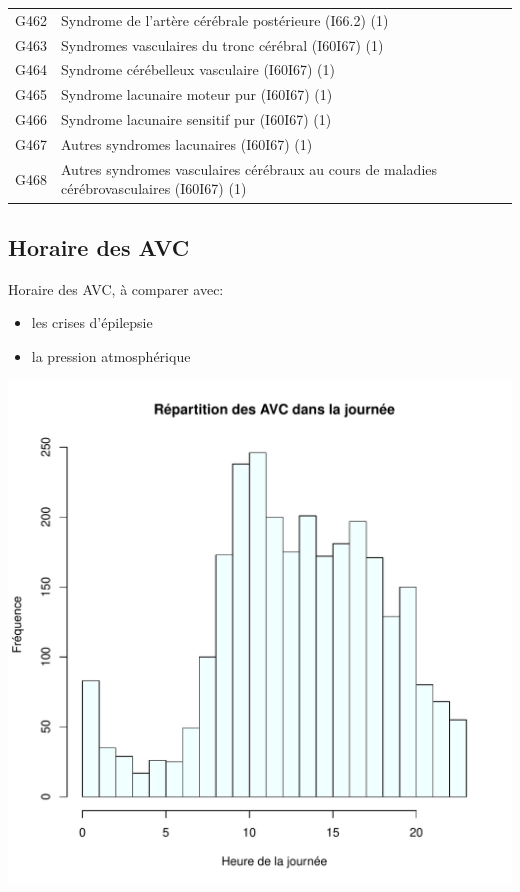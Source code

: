 \documentclass[12pt,english,french,twoside]{book}\usepackage[]{graphicx}\usepackage[]{color}
\makeatletter
\def\maxwidth{ %
  \ifdim\Gin@nat@width>\linewidth
    \linewidth
  \else
    \Gin@nat@width
  \fi
}
\newenvironment{knitrout}{}{} %
\makeatother
\begin{document}
{\begin{longtable}{|l|l|}
 G462 & Syndrome de l'artère cérébrale postérieure (I66.2) (1) \\
 G463 & Syndromes vasculaires du tronc cérébral (I60I67) (1) \\
 G464 & Syndrome cérébelleux vasculaire (I60I67) (1) \\
 G465 & Syndrome lacunaire moteur pur (I60I67) (1) \\
 G466 & Syndrome lacunaire sensitif pur (I60I67) (1) \\
 G467 & Autres syndromes lacunaires (I60I67) (1) \\
 G468 & Autres syndromes vasculaires cérébraux au cours de maladies cérébrovasculaires (I60I67) (1) \\
  \hline
\end{longtable}
} %




\subsection*{Horaire des AVC}

Horaire des AVC, à comparer avec:
\begin{itemize}
  \item les crises d'épilepsie
  \item la pression atmosphérique
\end{itemize}

\begin{knitrout}
\color{fgcolor}
\includegraphics[width=\maxwidth]{figure/heure_avc} 

\end{knitrout}
\end{document}
